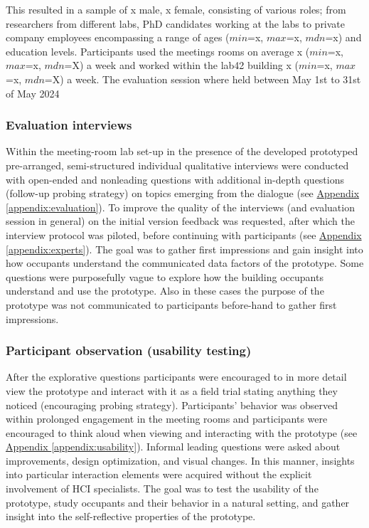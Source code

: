 This resulted in a sample of x male, x female, consisting of various roles; from researchers from different labs, PhD candidates working at the labs to private company employees encompassing a range of ages ($min$=x, $max$=x, $mdn$=x) and education levels. Participants used the meetings rooms on average x ($min$=x, $max$=x, $mdn$=X) a week and worked within the lab42 building x ($min$=x, $max$=x, $mdn$=X) a week. The evaluation session where held between May 1st to 31st of May 2024

\subsubsection{Evaluation interviews}

Within the meeting-room lab set-up in the presence of the developed prototyped pre-arranged, semi-structured individual qualitative interviews were conducted with open-ended and nonleading questions with additional in-depth questions (follow-up probing strategy) on topics emerging from the dialogue (see \hyperref[appendix:evaluation]{Appendix \ref*{appendix:evaluation}}). To improve the quality of the interviews (and evaluation session in general) on the initial version feedback was requested, after which the interview protocol was piloted, before continuing with participants (see \hyperref[appendix:experts]{Appendix \ref*{appendix:experts}}). The goal was to gather first impressions and gain insight into how occupants understand the communicated data factors of the prototype. Some questions were purposefully vague to explore how the building occupants understand and use the prototype. Also in these cases the purpose of the prototype was not communicated to participants before-hand to gather first impressions.

\subsubsection{Participant observation (usability testing)}

After the explorative questions participants were encouraged to in more detail view the prototype and interact with it as a field trial stating anything they noticed (encouraging probing strategy). Participants' behavior was observed within prolonged engagement in the meeting rooms and participants were encouraged to think aloud when viewing and interacting with the prototype (see \hyperref[appendix:usability]{Appendix \ref*{appendix:usability}}). Informal leading questions were asked about improvements, design optimization, and visual changes. In this manner, insights into particular interaction elements were acquired without the explicit involvement of HCI specialists. The goal was to test the usability of the prototype, study occupants and their behavior in a natural setting, and gather insight into the self-reflective properties of the prototype. 

